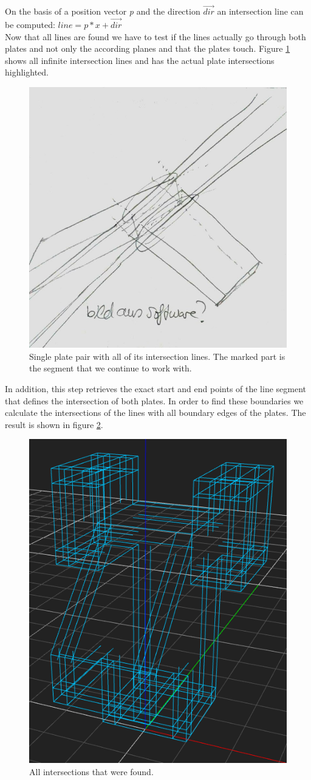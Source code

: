 \documentclass[../ClassicThesis.tex]{subfiles}
\begin{document}
On the basis of a position vector \emph{p} and the direction $\vec{dir}$ an intersection line can be computed: $ line = p*x + \vec{dir}$
\\
Now that all lines are found we have to test if the lines actually go through both plates and not only the according planes and that the plates touch. Figure \ref{fig:infiniteIntersections} shows all infinite intersection lines and has the actual plate intersections highlighted.
\begin{figure}[!ht]
\centering
\includegraphics[width=.5\columnwidth]{Images/06-1-graph-fourIntersectionLines.jpg}
\caption{Single plate pair with all of its intersection lines. The marked part is the segment that we continue to work with.}
\label{fig:infiniteIntersections}
\end{figure}
In addition, this step retrieves the exact start and end points of the line segment that defines the intersection of both plates. In order to find these boundaries we calculate the intersections of the lines with all boundary edges of the plates. The result is shown in figure \ref{fig:allBoundaries}.\\
\begin{figure}[!ht]
\centering
\includegraphics[width=.5\columnwidth]{Images/HeadAllBoundaries.png}
\caption{All intersections that were found. }
\label{fig:allBoundaries}
\end{figure}
\end{document}
